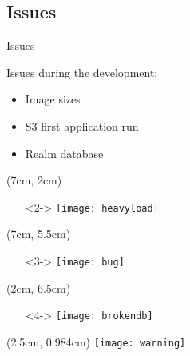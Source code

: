 \subsection{Issues}
\begin{frame}{Issues}
  
  Issues during the development:
  \begin{itemize}
   \item<2-> Image sizes
   \item<3-> S3 first application run
   \item<4-> Realm database
  \end{itemize}
  
  \begin{textblock*}{5cm}(7cm, 2cm)
  \begin{itemize}
   \item[]<2-> \texttt{[image: heavyload]}
  \end{itemize}

  \end{textblock*}
  
  \begin{textblock*}{5cm}(7cm, 5.5cm)
  \begin{itemize}
   \item[]<3-> \texttt{[image: bug]}
  \end{itemize}
  \end{textblock*}

  \begin{textblock*}{5cm}(2cm, 6.5cm)
  \begin{itemize}
   \item[]<4-> \texttt{[image: brokendb]}
  \end{itemize}
  \end{textblock*}


  \begin{textblock*}{5cm}(2.5cm, 0.984cm)
   \texttt{[image: warning]}
  \end{textblock*}
\end{frame}
